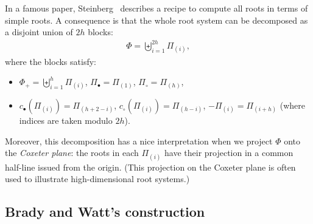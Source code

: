 \documentclass[11pt]{article}
\theoremstyle{definition}
\begin{document}
In a famous paper, Steinberg~\cite{steinberg} describes a recipe to compute all roots in terms of simple roots.  A consequence is that the whole root system can be decomposed as a disjoint union of $2h$ blocks:
\begin{align}
    \Phi = \biguplus_{i=1}^{2h} \Pi_{(i)},
\end{align}
where the blocks satisfy:
\begin{itemize}
    \item $\Phi_+ = \biguplus_{i=1}^{h} \Pi_{(i)}$, $\Pi_\bullet = \Pi_{(1)}$, $\Pi_\circ = \Pi_{(h)}$,
    \item $c_\bullet(\Pi_{(i)}) = \Pi_{(h+2-i)}$, $c_\circ(\Pi_{(i)}) = \Pi_{(h-i)}$, $-\Pi_{(i)} = \Pi_{(i+h)}$ (where indices are taken modulo $2h$).
\end{itemize}
Moreover, this decomposition has a nice interpretation when we project $\Phi$ onto the {\it Coxeter plane}: the roots in each $\Pi_ {(i)}$ have their projection in a common half-line issued from the origin.  (This projection on the Coxeter plane is often used to illustrate high-dimensional root systems.)%


\subsection{Brady and Watt's construction}
\end{document}
